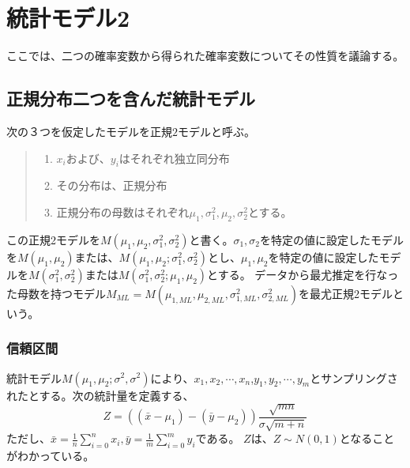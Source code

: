 

\chapter{統計モデル2}
ここでは、二つの確率変数から得られた確率変数についてその性質を議論する。

\section{正規分布二つを含んだ統計モデル}
次の３つを仮定したモデルを正規$2$モデルと呼ぶ。
\begin{quote}
    \begin{enumerate}[(1)]
    \item $x_i$および、$y_i$はそれぞれ独立同分布
    \item その分布は、正規分布
    \item 正規分布の母数はそれぞれ$\mu_1,\sigma_1^2,\mu_2,\sigma_2^2$とする。
    \end{enumerate}
\end{quote}
この正規2モデルを$M(\mu_1,\mu_2,\sigma_1^2,\sigma_2^2)$と書く。$\sigma_1,\sigma_2$を特定の値に設定したモデルを$M(\mu_1,\mu_2)$または、$M(\mu_1,\mu_2;\sigma^2_1,\sigma^2_2)$とし、$\mu_1,\mu_2$を特定の値に設定したモデルを$M(\sigma_1^2,\sigma_2^2)$または$M(\sigma_1^2,\sigma_2^2;\mu_1,\mu_2)$とする。
データから最尤推定を行なった母数を持つモデル$M_{ML}=M(\mu_{1,ML},\mu_{2,ML},\sigma_{1,ML}^2,\sigma^2_{2,ML})$を最尤正規2モデルという。

\subsection{信頼区間}
統計モデル$M(\mu_1,\mu_2;\sigma^2,\sigma^2)$により、$x_1,x_2,\cdots,x_n$,$y_1,y_2,\cdots,y_m$とサンプリングされたとする。次の統計量を定義する、
$$
Z=((\bar{x}-\mu_1)-(\bar{y}-\mu_2))\frac{\sqrt{mn}}{\sigma\sqrt{m+n}}
$$
ただし、$\bar{x}=\frac{1}{n}\sum_{i=0}^{n} x_i,\bar{y}=\frac{1}{m}\sum_{i=0}^m y_i$である。
$Z$は、$Z\sim N(0,1)$となることがわかっている。

